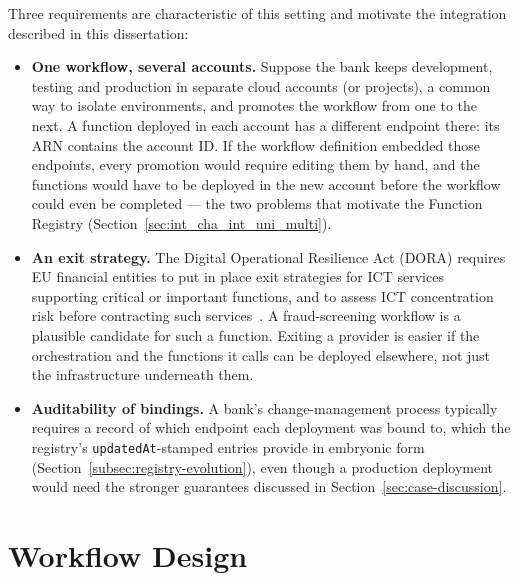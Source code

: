 Three requirements are characteristic of this setting and motivate the integration described in
this dissertation:

\begin{itemize}
    \item \textbf{One workflow, several accounts.} Suppose the bank keeps development, testing and
    production in separate cloud accounts (or projects), a common way to isolate environments, and
    promotes the workflow from one to the next. A function deployed in each account has a different
    endpoint there: its ARN contains the account ID. If the workflow definition embedded those
    endpoints, every promotion would require editing them by hand, and the functions would have to
    be deployed in the new account before the workflow could even be completed --- the two problems
    that motivate the Function Registry (Section~\ref{sec:int_cha_int_uni_multi}).
    \item \textbf{An exit strategy.} The Digital Operational Resilience Act (DORA) requires EU
    financial entities to put in place exit strategies for ICT services supporting critical or
    important functions, and to assess ICT concentration risk before contracting such
    services~\cite[Arts.~28(8) and~29]{dora2022}. A fraud-screening workflow is a plausible
    candidate for such a function. Exiting a provider is easier if the orchestration and the
    functions it calls can be deployed elsewhere, not just the infrastructure underneath them.
    \item \textbf{Auditability of bindings.} A bank's change-management process typically requires
    a record of which endpoint each deployment was bound to, which the
    registry's \texttt{updatedAt}-stamped entries provide in embryonic form
    (Section~\ref{subsec:registry-evolution}), even though a production deployment would need the
    stronger guarantees discussed in Section~\ref{sec:case-discussion}.
\end{itemize}

\section{Workflow Design}
\label{sec:case-design}

